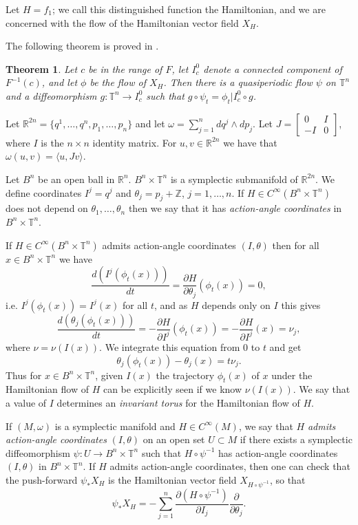 \documentclass{article}
\newtheorem{theorem}{Theorem}
\begin{document}
Let $H=f_1$; we call this distinguished function the Hamiltonian, and we are
concerned with the flow of the Hamiltonian vector field $X_H$.

The following theorem is proved in \cite[Theorem 5.2.24]{foundations}. 

\begin{theorem}
Let $c$ be in the range of $F$, let $I_c^0$ denote a connected component
of $F^{-1}(c)$, and let $\phi$ be the flow of $X_H$. Then there is a quasiperiodic flow $\psi$ on $\mathbb{T}^n$ and a diffeomorphism $g:\mathbb{T}^n \to I_c^0$ such that $g \circ \psi_t=\phi_t|I_c^0 \circ g$.
\end{theorem}

Let $\mathbb{R}^{2n}=\{q^1,\ldots,q^n,p_1,\ldots,p_n\}$ and let
$\omega=\sum_{j=1}^n dq^j \wedge dp_j$.
Let $J=\begin{bmatrix}0&I\\-I&0\end{bmatrix}$, where $I$ is the $n \times n$
identity matrix. For $u,v \in \mathbb{R}^{2n}$ we have that $\omega(u,v)=\langle u,Jv \rangle$. 

Let $B^n$ be an open ball in $\mathbb{R}^n$. $B^n \times \mathbb{T}^n$
is a symplectic submanifold of $\mathbb{R}^{2n}$. We define coordinates
$I^j=q^j$ and $\theta_j=p_j+\mathbb{Z}$, $j=1,\ldots,n$.
If $H \in C^\infty(B^n \times \mathbb{T}^n)$ does not depend on $\theta_1,\ldots,\theta_n$ then we say that it has {\em action-angle coordinates}
in $B^n \times \mathbb{T}^n$.

If $H \in C^\infty(B^n \times \mathbb{T}^n)$ admits action-angle coordinates
$(I,\theta)$ then for all $x \in B^n \times \mathbb{T}^n$ we have
\[
\frac{d(I^j(\phi_t(x)))}{dt}=\frac{\partial H}{\partial \theta_j}(\phi_t(x))=0,
\]
i.e. $I^j(\phi_t(x))=I^j(x)$ for all $t$, and as $H$ depends only
on $I$ this gives
\[
\frac{d(\theta_j(\phi_t(x)))}{dt}=-\frac{\partial H}{\partial I^j}(\phi_t(x))=
-\frac{\partial H}{\partial I^j}(x)=\nu_j,
\]
where $\nu=\nu(I(x))$.
We integrate this equation from $0$ to $t$ and get
\[
\theta_j(\phi_t(x))-\theta_j(x)=t\nu_j.
\]
Thus for $x \in B^n \times \mathbb{T}^n$, given
$I(x)$ the trajectory $\phi_t(x)$ of $x$ under the Hamiltonian flow of $H$ 
can be explicitly seen if we know $\nu(I(x))$.
We say that a value of $I$ determines an {\em invariant torus} for the Hamiltonian flow of $H$.

If $(M,\omega)$ is a symplectic manifold and $H \in C^\infty(M)$, we say
that $H$ {\em admits action-angle coordinates} $(I,\theta)$ on an open set
$U \subset M$ if there exists a symplectic diffeomorphism $\psi:U \to
B^n \times \mathbb{T}^n$ such that $H \circ \psi^{-1}$ has action-angle
coordinates $(I,\theta)$ in $B^n \times \mathbb{T}^n$. If $H$ admits action-angle coordinates, then one can check that the push-forward $\psi_* X_H$ is
the Hamiltonian vector field $X_{H \circ \psi^{-1}}$, so that
\[
\psi_* X_H = - \sum_{j=1}^n \frac{\partial(H\circ \psi^{-1})}{\partial I_j}
\frac{\partial}{\partial \theta_j}.
\]
\end{document}
